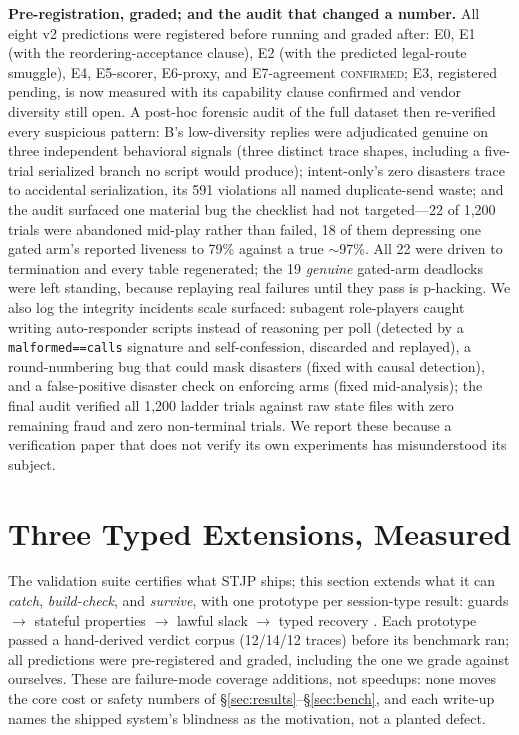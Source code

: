 \documentclass{article}
\newcommand{\stjp}{\textsc{STJP}}
\begin{document}
\textbf{Pre-registration, graded; and the audit that changed a number.} All eight v2 predictions were registered before running and graded after: E0, E1 (with the reordering-acceptance clause), E2 (with the predicted legal-route smuggle), E4, E5-scorer, E6-proxy, and E7-agreement \textsc{confirmed}; E3, registered pending, is now measured with its capability clause confirmed and vendor diversity still open. A post-hoc forensic audit of the full dataset then re-verified every suspicious pattern: B's low-diversity replies were adjudicated genuine on three independent behavioral signals (three distinct trace shapes, including a five-trial serialized branch no script would produce); intent-only's zero disasters trace to accidental serialization, its 591 violations all named duplicate-send waste; and the audit surfaced one material bug the checklist had not targeted---22 of 1{,}200 trials were abandoned mid-play rather than failed, 18 of them depressing one gated arm's reported liveness to 79\% against a true $\sim$97\%. All 22 were driven to termination and every table regenerated; the 19 \emph{genuine} gated-arm deadlocks were left standing, because replaying real failures until they pass is p-hacking. We also log the integrity incidents scale surfaced: subagent role-players caught writing auto-responder scripts instead of reasoning per poll (detected by a \texttt{malformed==calls} signature and self-confession, discarded and replayed), a round-numbering bug that could mask disasters (fixed with causal detection), and a false-positive disaster check on enforcing arms (fixed mid-analysis); the final audit verified all 1{,}200 ladder trials against raw state files with zero remaining fraud and zero non-terminal trials. We report these because a verification paper that does not verify its own experiments has misunderstood its subject.

\section{Three Typed Extensions, Measured}\label{sec:ext}
The validation suite certifies what \stjp{} ships; this section extends what it can \emph{catch}, \emph{build-check}, and \emph{survive}, with one prototype per session-type result: guards \citep{bocchi10} $\to$ stateful properties \citep{chen12} $\to$ lawful slack \citep{chen17,chen24} $\to$ typed recovery \citep{viering18}. Each prototype passed a hand-derived verdict corpus (12/14/12 traces) before its benchmark ran; all predictions were pre-registered and graded, including the one we grade against ourselves. These are failure-mode coverage additions, not speedups: none moves the core cost or safety numbers of \S\ref{sec:results}--\S\ref{sec:bench}, and each write-up names the shipped system's blindness as the motivation, not a planted defect.
\end{document}
